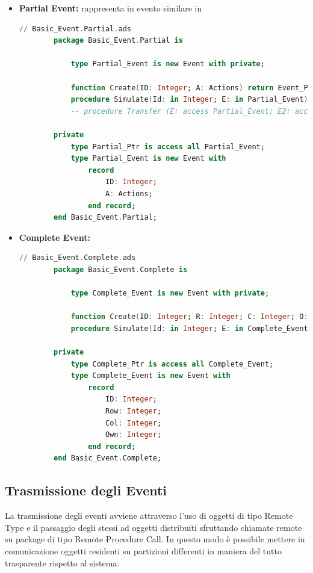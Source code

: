 \documentclass[aps,letterpaper,10pt]{article}
\begin{document}
\begin{itemize}
\begin{itemize}
	\end{itemize}
	\begin{itemize}
		\item \textbf{Partial Event:} rappresenta in evento similare in 
		\begin{lstlisting}[language=Ada]
		// Basic_Event.Partial.ads
		package Basic_Event.Partial is
    
		    type Partial_Event is new Event with private;
	
			function Create(ID: Integer; A: Actions) return Event_Ptr; 
		    procedure Simulate(Id: in Integer; E: in Partial_Event);
			-- procedure Transfer (E: access Partial_Event; E2: access Partial_Event);

		private
		    type Partial_Ptr is access all Partial_Event; 
		    type Partial_Event is new Event with
		        record
		            ID: Integer;
		            A: Actions;
		        end record;
		end Basic_Event.Partial;
		\end{lstlisting}
	\end{itemize}
	\begin{itemize}
		\item \textbf{Complete Event:}
		\begin{lstlisting}[language=Ada]
		// Basic_Event.Complete.ads
		package Basic_Event.Complete is
    
		    type Complete_Event is new Event with private;
	
		    function Create(ID: Integer; R: Integer; C: Integer; O: Integer) return Event_Ptr; 
		    procedure Simulate(Id: in Integer; E: in Complete_Event);

		private
		    type Complete_Ptr is access all Complete_Event; 
		    type Complete_Event is new Event with
		        record
		            ID: Integer;
		            Row: Integer;
		            Col: Integer;
					Own: Integer;
		        end record;
		end Basic_Event.Complete;
		\end{lstlisting}	
	\end{itemize}
	
\end{itemize}



\subsection{Trasmissione degli Eventi}

La trasmissione degli eventi avviene attraverso l'uso di oggetti di tipo Remote Type e il passaggio degli stessi ad oggetti distribuiti sfruttando chiamate remote su package di tipo Remote Procedure Call. In questo modo \`e possibile mettere in comunicazione oggetti residenti su partizioni differenti in maniera del tutto trasparente rispetto al sistema. \vspace{3mm}
\end{document}
